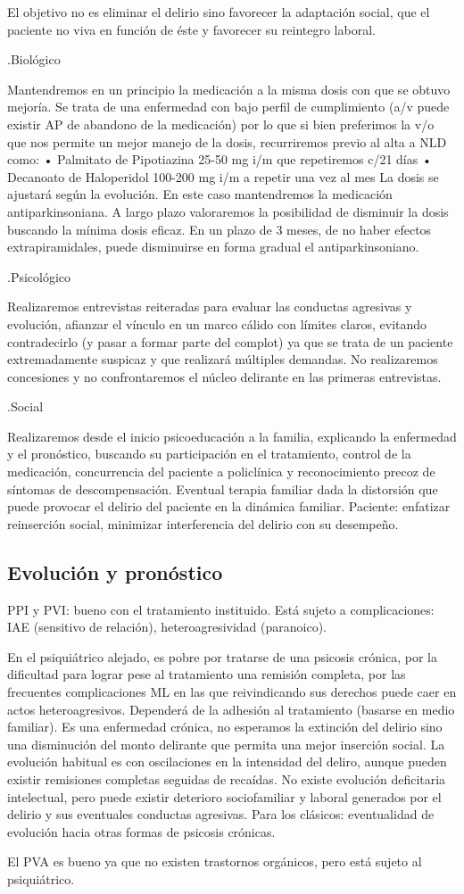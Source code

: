 El objetivo no es eliminar el delirio sino favorecer la adaptación social, que el paciente no viva en función de éste y favorecer su reintegro laboral.

.Biológico

Mantendremos en un principio la medicación a la misma dosis con que se obtuvo mejoría. Se trata de una enfermedad con bajo perfil de cumplimiento (a/v puede existir AP de abandono de la medicación) por lo que si bien preferimos la v/o que nos permite un mejor manejo de la dosis, recurriremos previo al alta a NLD como: • Palmitato de Pipotiazina 25-50 mg i/m que repetiremos c/21 días • Decanoato de Haloperidol 100-200 mg i/m a repetir una vez al mes La dosis se ajustará según la evolución. En este caso mantendremos la medicación antiparkinsoniana. A largo plazo valoraremos la posibilidad de disminuir la dosis buscando la mínima dosis eficaz. En un plazo de 3 meses, de no haber efectos extrapiramidales, puede disminuirse en forma gradual el antiparkinsoniano.

.Psicológico

Realizaremos entrevistas reiteradas para evaluar las conductas agresivas y evolución, afianzar el vínculo en un marco cálido con límites claros, evitando contradecirlo (y pasar a formar parte del complot) ya que se trata de un paciente extremadamente suspicaz y que realizará múltiples demandas. No realizaremos concesiones y no confrontaremos el núcleo delirante en las primeras entrevistas.

.Social

Realizaremos desde el inicio psicoeducación a la familia, explicando la enfermedad y el pronóstico, buscando su participación en el tratamiento, control de la medicación, concurrencia del paciente a policlínica y reconocimiento precoz de síntomas de descompensación. Eventual terapia familiar dada la distorsión que puede provocar el delirio del paciente en la dinámica familiar. Paciente: enfatizar reinserción social, minimizar interferencia del delirio con su desempeño.
\subsection*{Evolución y pronóstico}
PPI y PVI: bueno con el tratamiento instituido. Está sujeto a complicaciones: IAE (sensitivo de relación), heteroagresividad (paranoico).

En el psiquiátrico alejado, es pobre por tratarse de una psicosis crónica, por la dificultad para lograr pese al tratamiento una remisión completa, por las frecuentes complicaciones ML en las que reivindicando sus derechos puede caer en actos heteroagresivos. Dependerá de la adhesión al tratamiento (basarse en medio familiar). Es una enfermedad crónica, no esperamos la extinción del delirio sino una disminución del monto delirante que permita una mejor inserción social. La evolución habitual es con oscilaciones en la intensidad del deliro, aunque pueden existir remisiones completas seguidas de recaídas. No existe evolución deficitaria intelectual, pero puede existir deterioro sociofamiliar y laboral generados por el delirio y sus eventuales conductas agresivas. Para los clásicos: eventualidad de evolución hacia otras formas de psicosis crónicas.

El PVA es bueno ya que no existen trastornos orgánicos, pero está sujeto al psiquiátrico.
